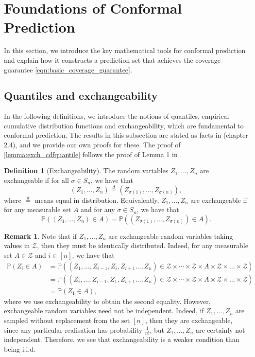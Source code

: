 \documentclass[11pt, titlepage]{article} %
\newcommand{\Prob}[1]{\mathbb{P}\left( #1 \right)}
\numberwithin{equation}{section}
\theoremstyle{definition}
\newtheorem{definition}{Definition}
\newtheorem{remark}{Remark}
\numberwithin{theorem}{section}
\numberwithin{lemma}{section}
\numberwithin{corollary}{section}
\numberwithin{proposition}{section}
\numberwithin{definition}{section}
\numberwithin{remark}{section}
\begin{document}
\section{Foundations of Conformal Prediction}
\label{sec:foundations_of_CP}

\noindent
In this section, we introduce the key mathematical tools for conformal prediction and explain how it constructs a prediction set that achieves the coverage guarantee \eqref{eqn:basic_coverage_guarantee}.

\subsection{Quantiles and exchangeability}
\label{subsec:quantiles_and_exchangeability}

In the following definitions, we introduce the notions of quantiles, empirical cumulative distribution functions and exchangeability, which are fundamental to conformal prediction. The results in this subsection are stated as facts in \cite{angelopoulos2024theoreticalfoundationsconformalprediction} (chapter 2.4), and we provide our own proofs for these. The proof of \cref{lemma:exch_cdfquantile} follows the proof of Lemma 1 in \cite{romano2019_CQR}.

\begin{definition}[Exchangeability]
    The random variables \(Z_1, ..., Z_n\) are exchangeable if for all \(\sigma \in S_n\), we have that \[(Z_1, \ldots, Z_n) \overset{d}{=} (Z_{\sigma(1)}, \ldots, Z_{\sigma(n)}),\] where \(\overset{d}{=}\) means equal in distribution. Equivalently, \(Z_1, ..., Z_n\) are exchangeable if for any measurable set \(A\) and for any \(\sigma \in S_n\), we have that \[\Prob{(Z_1, \ldots, Z_n) \in A} = \Prob{(Z_{\sigma(1)}, \ldots, Z_{\sigma(n)}) \in A}.\]
\label{defn:exch}
\end{definition}

\begin{remark}
Note that if \(Z_1, \ldots, Z_n\) are exchangeable random variables taking values in \(\mathcal{Z}\), then they must be identically distributed. Indeed, for any measurable set \(A \in \mathcal{Z}\) and \(i \in [n]\), we have that \begin{align*} 
    \Prob{Z_i \in A} &= \Prob{(Z_1, \ldots, Z_{i-1}, Z_i, Z_{i+1} \ldots, Z_n) \in \mathcal{Z} \times \cdots \times \mathcal{Z} \times A \times \mathcal{Z} \times \ldots \times \mathcal{Z}} \\
    &= \Prob{(Z_i, \ldots, Z_{i-1}, Z_1, Z_{i+1} \ldots, Z_n) \in \mathcal{Z} \times \cdots \times \mathcal{Z} \times A \times \mathcal{Z} \times \ldots \times \mathcal{Z}} \\
    &= \Prob{Z_1 \in A},
\end{align*} where we use exchangeability to obtain the second equality. However, exchangeable random variables need not be independent. Indeed, if \(Z_1, \ldots, Z_n\) are sampled without replacement from the set \([n]\), then they are exchangeable, since any particular realisation has probability \(\frac{1}{n!}\), but \(Z_1, \ldots, Z_n\) are certainly not independent. Therefore, we see that exchangeability is a weaker condition than being i.i.d.
\label{rmk:exch_dist}
\end{remark}
\end{document}
